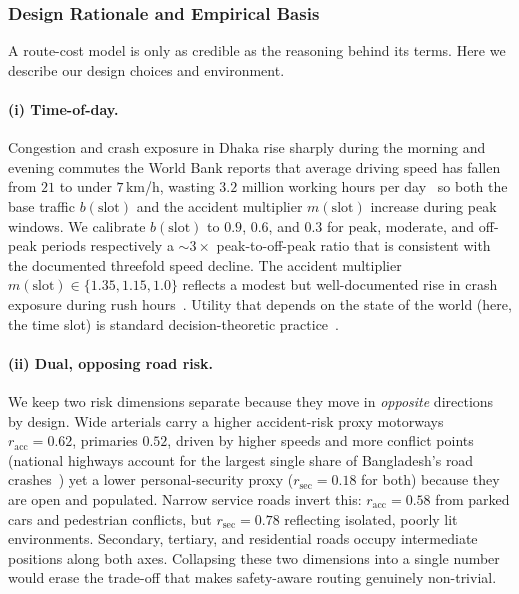 \documentclass{ai-lab-report}
\begin{document}
\subsubsection{Design Rationale and Empirical Basis}
\label{sec:a1defend}

A route-cost model is only as credible as the reasoning behind its terms. Here we describe our design choices and environment.

\paragraph{(i) Time-of-day.} Congestion and crash exposure in Dhaka rise sharply during the morning and evening commutes 
the World Bank reports that average driving speed has fallen from $21$ to under $7$\,km/h, wasting $3.2$ million working hours 
per day~\citep{worldbank2018dhaka,dailystar2018congestion} so both the base traffic $b(\mathrm{slot})$ and 
the accident multiplier $m(\mathrm{slot})$ increase during peak windows. We calibrate $b(\mathrm{slot})$ 
to $0.9$, $0.6$, and $0.3$ for peak, moderate, and off-peak periods respectively a ${\sim}3\times$ peak-to-off-peak 
ratio that is consistent with the documented threefold speed decline. The accident multiplier $m(\mathrm{slot})\in\{1.35,1.15,1.0\}$ 
reflects a modest but well-documented rise in crash exposure during rush hours~\citep{tbs2024accidents}. 
Utility that depends on the state of the world (here, the time slot) is standard decision-theoretic practice~\citep{russell2021ai}.

\paragraph{(ii) Dual, opposing road risk.} We keep two risk dimensions separate because they move in \emph{opposite} directions by design. 
Wide arterials carry a higher accident-risk proxy motorways $r_{\mathrm{acc}}=0.62$, primaries $0.52$, driven by 
higher speeds and more conflict points (national highways account for the largest single share of Bangladesh's road crashes~\citep{tbs2024accidents}) 
yet a lower personal-security proxy ($r_{\mathrm{sec}}=0.18$ for both) because they are open and populated. 
Narrow service roads invert this: $r_{\mathrm{acc}}=0.58$ from parked cars and pedestrian conflicts, but $r_{\mathrm{sec}}=0.78$ 
reflecting isolated, poorly lit environments. Secondary, tertiary, and residential roads occupy intermediate positions along both axes. 
Collapsing these two dimensions into a single number would erase the trade-off that makes safety-aware routing genuinely non-trivial.
\end{document}
